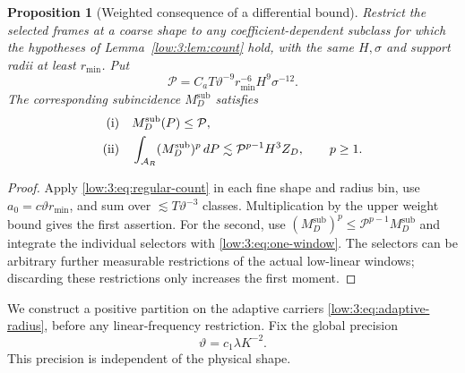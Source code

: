 \documentclass[11pt]{amsart}
\newtheorem{proposition}[theorem]{Proposition}
\theoremstyle{definition}
\theoremstyle{remark}
\numberwithin{equation}{section}
\begin{document}
\begin{proposition}[Weighted consequence of a differential bound]\label{low:3:prop:weighted}
Restrict the selected frames at a coarse shape to any coefficient-dependent subclass for which the hypotheses of Lemma~\ref{low:3:lem:count} hold, with the same $H,\sigma$ and support radii at least $r_{\min}$. Put
\begin{equation}\label{low:3:eq:count-polynomial}
\mathcal P=C_a T\vartheta^{-9}r_{\min}^{-6}H^9\sigma^{-12}.
\end{equation}
The corresponding subincidence $M_D^{\mathrm{sub}}$ satisfies
\begin{equation}\label{low:3:eq:weighted-moment}
\begin{aligned}
\textup{(i)}\quad &M_D^{\mathrm{sub}}(P)\leq\mathcal P,\\
\textup{(ii)}\quad &\int_{\mathcal A_R}(M_D^{\mathrm{sub}})^p\,dP\lesssim \mathcal P^{p-1}H^3 Z_D,\qquad p\geq1.
\end{aligned}
\end{equation}
\end{proposition}

\begin{proof}
Apply \eqref{low:3:eq:regular-count} in each fine shape and radius bin, use $a_0=c\vartheta r_{\min}$, and sum over $\lesssim T\vartheta^{-3}$ classes. Multiplication by the upper weight bound gives the first assertion. For the second, use $(M_D^{\mathrm{sub}})^p\leq\mathcal P^{p-1}M_D^{\mathrm{sub}}$ and integrate the individual selectors with \eqref{low:3:eq:one-window}. The selectors can be arbitrary further measurable restrictions of the actual low-linear windows; discarding these restrictions only increases the first moment.
\end{proof}

We construct a positive partition on the adaptive carriers \eqref{low:3:eq:adaptive-radius}, before any linear-frequency restriction. Fix the global precision
\begin{equation}\label{low:3:eq:precision}
\vartheta=c_1\lambda K^{-2}.
\end{equation}
This precision is independent of the physical shape.
\end{document}
